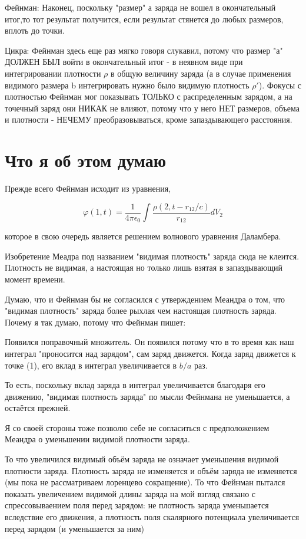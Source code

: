 \documentclass{article}
\begin{document}
Фейнман:
Наконец, поскольку "размер" а заряда не вошел в окончательный итог,то тот результат получится, если результат стянется до любых размеров, вплоть до точки.

Цикра:
Фейнман здесь еще раз мягко говоря слукавил, потому что размер "а" ДОЛЖЕН БЫЛ войти в окончательный итог - в неявном виде при интегрировании плотности $\rho$ в общую величину заряда (а в случае применения видимого размера b интегрировать нужно было видимую плотность $\rho'$).
Фокусы с плотностью Фейнман мог показывать ТОЛЬКО с распределенным зарядом, а на точечный заряд они НИКАК не влияют, потому что у него НЕТ размеров, объема и плотности - НЕЧЕМУ преобразовываться, кроме запаздывающего расстояния.

\section{Что я об этом думаю}

Прежде всего Фейнман исходит из уравнения, 

$$\varphi(1,t) = \frac{1}{4\pi\epsilon_0}\int\frac{\rho(2,t-r_{12}/c)}{r_{12}}dV_{2}$$

которое в свою очередь является решением волнового уравнения Даламбера.

Изобретение Меадра под названием "видимая плотность" заряда сюда не клеится. Плотность не видимая, а настоящая но только лишь взятая  в запаздывающий момент времени.

Думаю, что и Фейнман бы не согласился с утверждением Меандра о том, что "видимая плотность" заряда более рыхлая чем настоящая плотность заряда. Почему я так думаю, потому что Фейнман пишет:

Появился поправочный множитель. Он появился потому что в то время как наш интеграл "проносится над зарядом", сам заряд движется. Когда заряд движется к точке (1), его вклад в интеграл увеличивается в $b/a$ раз.

То есть, поскольку вклад заряда в интеграл увеличивается благодаря его движению, "видимая плотность заряда" по мысли Фейнмана не уменьшается, а остаётся прежней. 

Я со своей стороны тоже позволю себе не согласиться с предположением Меандра о уменьшении видимой плотности заряда. 

То что увеличился видимый объём заряда не означает уменьшения видимой плотности заряда. Плотность заряда не изменяется и объём заряда не изменяется (мы пока не рассматриваем лоренцево сокращение). То что Фейнман пытался показать увеличением видимой длины заряда на мой взгляд связано с спрессовываением поля перед зарядом: не плотность заряда уменьшается вследствие его движения, а плотность поля скалярного потенциала увеличивается перед зарядом (и уменьшается за ним)
\end{document}
